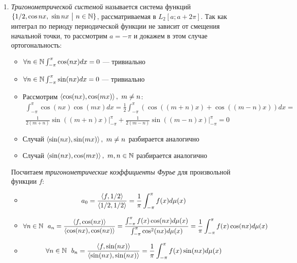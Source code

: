 \begin{example}
\begin{enumerate}
		\item \textit{Тригонометрической системой} называется система функций $\{1 / 2, \cos nx,\ \sin nx \ \big|\  n \in \mathbb{N}\}$, рассматриваемая в $L_2[a; a + 2\pi]$. Так как интеграл по периоду периодической функции не зависит от смещения начальной точки, то рассмотрим $a = -\pi$ и докажем в этом случае ортогональность:
		\begin{itemize}
			\item \(\forall n \in \mathbb{N} \int_{-\pi}^\pi \cos(nx)dx = 0\) --- тривиально
			
			\item \(\forall n \in \mathbb{N} \int_{-\pi}^\pi \sin(nx)dx = 0\) --- тривиально
			
			\item Рассмотрим $\tbr{\cos(nx), \cos(mx)},\ m \neq n$:
			\begin{multline*}
				\int_{-\pi}^\pi \cos(nx)\cos(mx)dx = \frac{1}{2} \int_{-\pi}^\pi (\cos((m + n)x) + \cos((m - n)x))dx =
				\\
				\frac{1}{2(m + n)}\sin((m + n)x)\Big|_{-\pi}^\pi + \frac{1}{2(m - n)}\sin((m - n)x)\Big|_{-\pi}^\pi = 0
			\end{multline*}
			
			\item Случай $\left\langle\sin(nx), \sin(mx)\right\rangle,\ m \neq n$ разбирается аналогично
			
			\item Случай $\left\langle\sin(nx), \cos(mx)\right\rangle,\ m, n \in \mathbb{N}$ разбирается аналогично
		\end{itemize}
		Посчитаем \textit{тригонометрические коэффициенты Фурье} для произвольной функции $f$:
		\begin{itemize}
			\item \[
				a_0 = \frac{\left\langle f, 1 / 2\right\rangle}{\left\langle1 / 2, 1 / 2\right\rangle} = \frac{1}{\pi} \int_{-\pi}^\pi f(x)d\mu(x)
			\]
			
			\item \[
				\forall n \in \mathbb{N}\ \ a_n = \frac{\left\langle f, \cos(nx)\right\rangle}{\left\langle\cos(nx), \cos(nx)\right\rangle} = \frac{\int_{-\pi}^\pi f(x)\cos(nx)d\mu(x)}{\int_{-\pi}^\pi \cos^2(nx)d\mu(x)} = \frac{1}{\pi} \int_{-\pi}^\pi f(x)\cos(nx)d\mu(x)
			\]
			
			\item \[
				\forall n \in \mathbb{N}\ \ b_n = \frac{\left\langle f, \sin(nx)\right\rangle}{\left\langle\sin(nx), \sin(nx)\right\rangle} = \frac{1}{\pi} \int_{-\pi}^\pi f(x)\sin(nx)d\mu(x)
			\]
		\end{itemize}
	\end{enumerate}
\end{example}

